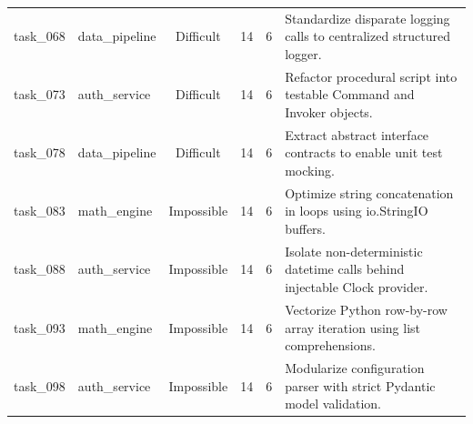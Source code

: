 \begin{table}[t]
\begin{tabular}{llcccl}
task\_068 & data\_pipeline & Difficult & 14 & 6 & Standardize disparate logging calls to centralized structured logger. \\
task\_073 & auth\_service & Difficult & 14 & 6 & Refactor procedural script into testable Command and Invoker objects. \\
task\_078 & data\_pipeline & Difficult & 14 & 6 & Extract abstract interface contracts to enable unit test mocking. \\
task\_083 & math\_engine & Impossible & 14 & 6 & Optimize string concatenation in loops using io.StringIO buffers. \\
task\_088 & auth\_service & Impossible & 14 & 6 & Isolate non-deterministic datetime calls behind injectable Clock provider. \\
task\_093 & math\_engine & Impossible & 14 & 6 & Vectorize Python row-by-row array iteration using list comprehensions. \\
task\_098 & auth\_service & Impossible & 14 & 6 & Modularize configuration parser with strict Pydantic model validation. \\
\bottomrule
\end{tabular}
\end{table}

